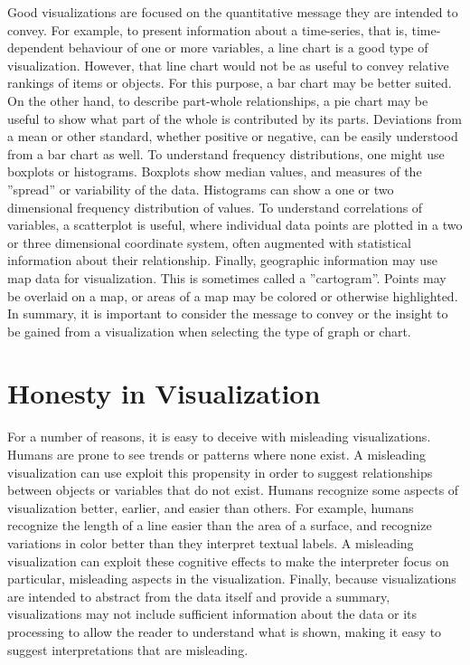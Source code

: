 Good visualizations are focused on the quantitative message they are intended to convey. For example, to present information about a time-series, that is, time-dependent behaviour of one or more variables, a line chart is a good type of visualization. However, that line chart would not be as useful to convey relative rankings of items or objects. For this purpose, a bar chart may be better suited. On the other hand, to describe part-whole relationships, a pie chart may be useful to show what part of the whole is contributed by its parts. Deviations from a mean or other standard, whether positive or negative, can be easily understood from a bar chart as well. To understand frequency distributions, one might use boxplots or histograms. Boxplots show median values, and measures of the ''spread'' or variability of the data. Histograms can show a one or two dimensional frequency distribution of values. To understand correlations of variables, a scatterplot is useful, where individual data points are plotted in a two or three dimensional coordinate system, often augmented with statistical information about their relationship. Finally, geographic information may use map data for visualization. This is sometimes called a ''cartogram''. Points may be overlaid on a map, or areas of a map may be colored or otherwise highlighted. In summary, it is important to consider the message to convey or the insight to be gained from a visualization when selecting the type of graph or chart.

\section{Honesty in Visualization}

For a number of reasons, it is easy to deceive with misleading visualizations. Humans are prone to see trends or patterns where none exist. A misleading visualization can use exploit this propensity in order to suggest relationships between objects or variables that do not exist. Humans recognize some aspects of visualization better, earlier, and easier than others. For example, humans recognize the length of a line easier than the area of a surface, and recognize variations in color better than they interpret textual labels. A misleading visualization can exploit these cognitive effects to make the interpreter focus on particular, misleading aspects in the visualization. Finally, because visualizations are intended to abstract from the data itself and provide a summary, visualizations may not include sufficient information about the data or its processing to allow the reader to understand what is shown, making it easy to suggest interpretations that are misleading.

